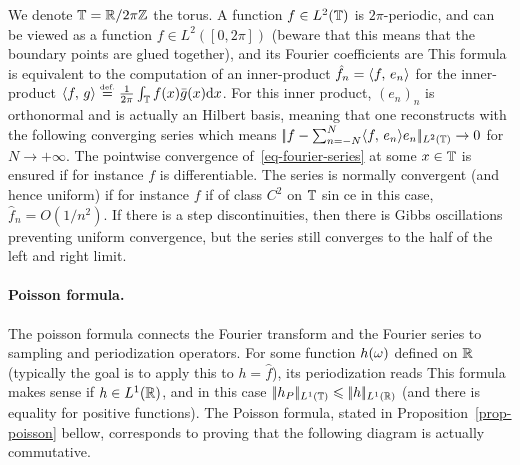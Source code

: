 We denote $\mathbb{T}=\mathbb{R}/2\pi\mathbb{Z}$ the torus.
%
A function $f \in L^2(\mathbb{T})$ is $2\pi$-periodic, and can be viewed as a function $f \in L^2([0,2\pi])$ (beware that this means that the boundary points are glued together), and its Fourier coefficients are
This formula is equivalent to the computation of an inner-product $\hat f_n = \langle f,\,e_n\rangle$ for the inner-product $\langle f,\,g\rangle \stackrel{\mbox{\upshape\tiny def.}}{=} \frac{1}{2\pi} \int_{\mathbb{T}} f(x) \bar g(x) \mathrm{d} x$. 
%
For this inner product, $(e_n)_n$ is orthonormal and is actually an Hilbert basis, meaning that one reconstructs with the following converging series 
which means $|\!| f-\sum_{n=-N}^N \langle f,\,e_n\rangle e_n |\!|_{L^2(\mathbb{T})} \rightarrow 0$ for $N \rightarrow +\infty$.
%
The pointwise convergence of~\eqref{eq-fourier-series} at some $x \in \mathbb{T}$ is ensured if for instance $f$ is differentiable. The series is normally convergent (and hence uniform) if for instance $f$ if of class $C^2$ on $\mathbb{T}$ sin ce in this case, $\hat f_n = O(1/n^2)$. 
%
If there is a step discontinuities, then there is Gibbs oscillations preventing uniform convergence, but the series still converges to the half of the left and right limit.


\paragraph{Poisson formula.}

The poisson formula connects the Fourier transform and the Fourier series to sampling and periodization operators.
%
For some function $h(\omega)$ defined on $\mathbb{R}$ (typically the goal is to apply this to $h=\hat f$), its periodization reads
This formula makes sense if $h \in L^1(\mathbb{R})$, and in this case $|\!| h_P |\!|_{L^1(\mathbb{T})} \leqslant |\!| h |\!|_{L^1(\mathbb{R})}$ (and there is equality for positive functions). 
%
The Poisson formula, stated in Proposition~\ref{prop-poisson} bellow, corresponds to proving that the following diagram
is actually commutative.


